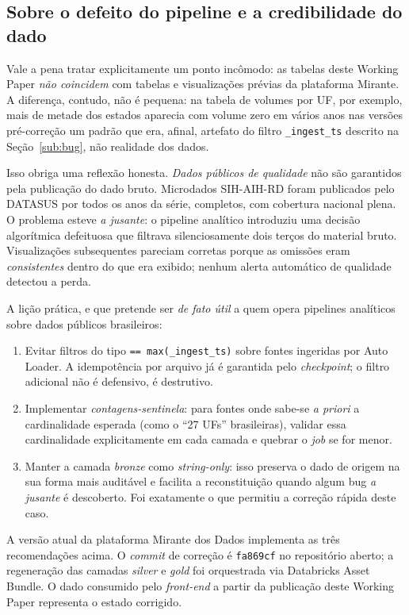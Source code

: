 \documentclass[12pt,a4paper,oneside]{article}
\begin{document}
\subsection{Sobre o defeito do pipeline e a credibilidade do dado}

Vale a pena tratar explicitamente um ponto incômodo: as tabelas
deste Working Paper \textit{não coincidem} com tabelas e
visualizações prévias da plataforma Mirante. A diferença, contudo,
não é pequena: na tabela de volumes por UF, por exemplo, mais de
metade dos estados aparecia com volume zero em vários anos nas
versões pré-correção \textemdash{} um padrão que era, afinal,
artefato do filtro \texttt{\_ingest\_ts} descrito na
Seção~\ref{sub:bug}, não realidade dos dados.

Isso obriga uma reflexão honesta. \textit{Dados públicos de
qualidade} não são garantidos pela publicação do dado bruto.
Microdados SIH-AIH-RD foram publicados pelo DATASUS por todos
os anos da série, completos, com cobertura nacional plena. O
problema esteve \textit{a jusante}: o pipeline analítico
introduziu uma decisão algorítmica defeituosa que filtrava
silenciosamente dois terços do material bruto. Visualizações
subsequentes pareciam corretas porque as omissões eram
\textit{consistentes} dentro do que era exibido; nenhum alerta
automático de qualidade detectou a perda.

A lição prática, e que pretende ser \textit{de fato útil} a
quem opera pipelines analíticos sobre dados públicos brasileiros:

\begin{enumerate}
\item Evitar filtros do tipo \texttt{== max(\_ingest\_ts)} sobre
fontes ingeridas por Auto Loader. A idempotência por arquivo já
é garantida pelo \textit{checkpoint}; o filtro adicional não é
defensivo, é destrutivo.
\item Implementar \textit{contagens-sentinela}: para fontes onde
sabe-se \textit{a priori} a cardinalidade esperada (como o
``27 UFs'' brasileiras), validar essa cardinalidade explicitamente
em cada camada e quebrar o \textit{job} se for menor.
\item Manter a camada \textit{bronze} como \textit{string-only}:
isso preserva o dado de origem na sua forma mais auditável e
facilita a reconstituição quando algum bug \textit{a jusante} é
descoberto. Foi exatamente o que permitiu a correção rápida deste
caso.
\end{enumerate}

A versão atual da plataforma Mirante dos Dados implementa as
três recomendações acima. O \textit{commit} de correção é
\texttt{fa869cf} no repositório aberto; a regeneração das camadas
\textit{silver} e \textit{gold} foi orquestrada via Databricks
Asset Bundle. O dado consumido pelo \textit{front-end} a partir
da publicação deste Working Paper representa o estado corrigido.
\end{document}
